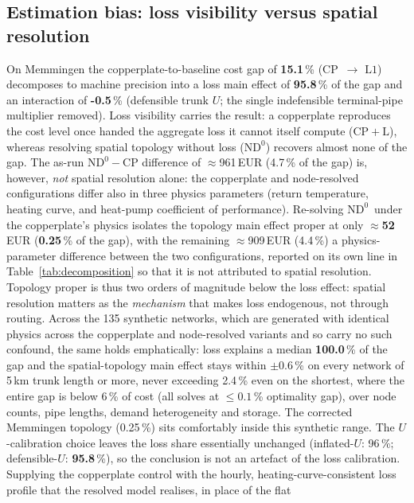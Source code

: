 \documentclass[a4paper,fleqn]{cas-sc}
\newcommand{\CP}{\ensuremath{\mathrm{CP}}}      %
\newcommand{\CPL}{\ensuremath{\mathrm{CP{+}L}}} %
\newcommand{\NDz}{\ensuremath{\mathrm{ND^{0}}}} %
\newcommand{\Lone}{\ensuremath{\mathrm{L1}}}    %
\begin{document}
\subsection{Estimation bias: loss visibility versus spatial resolution}\label{subsec:decomp}
On Memmingen the copperplate-to-baseline cost gap of \textbf{15.1}\,\%
(\CP\ $\to$ \Lone) decomposes to machine precision into a loss main effect of
\textbf{95.8}\,\% of the gap and an interaction of \textbf{-0.5}\,\% (defensible trunk $U$; the single
indefensible terminal-pipe multiplier removed). Loss visibility carries the
result: a copperplate reproduces the cost level once handed the aggregate loss it
cannot itself compute (\CPL), whereas resolving spatial topology without loss
(\NDz) recovers almost none of the gap. The as-run $\NDz-\CP$ difference of
$\approx$961\,EUR (4.7\,\% of the gap) is, however, \emph{not} spatial resolution alone: the
copperplate and node-resolved configurations differ also in three physics parameters
(return temperature, heating curve, and heat-pump coefficient of performance). Re-solving \NDz\
under the copperplate's physics isolates the topology main effect proper at only
$\approx$\textbf{52}\,EUR (\textbf{0.25}\,\% of the gap), with the remaining $\approx$909\,EUR
(4.4\,\%) a physics-parameter difference between the two configurations, reported on its own line
in Table~\ref{tab:decomposition} so that it is not attributed to spatial resolution. Topology
proper is thus two orders of magnitude below the loss effect: spatial resolution matters as the
\emph{mechanism} that makes loss endogenous, not through routing. Across the 135
synthetic networks, which are generated with identical physics across the copperplate and
node-resolved variants and so carry no such confound, the same holds emphatically: loss explains
a median \textbf{100.0}\,\% of the gap and the spatial-topology main effect stays
within $\pm$0.6\,\% on every network of 5\,km trunk length or more, never exceeding 2.4\,\% even on the shortest, where the entire gap is below 6\,\% of cost (all solves at
$\le0.1$\,\% optimality gap), over node counts, pipe lengths, demand heterogeneity and
storage. The corrected Memmingen topology (0.25\,\%) sits comfortably inside this synthetic range.
The $U$-calibration choice leaves the loss share essentially unchanged (inflated-$U$: 96\,\%;
defensible-$U$: \textbf{95.8}\,\%), so the conclusion is not an
artefact of the loss calibration. Supplying the copperplate control with the hourly,
heating-curve-consistent loss profile that the resolved model realises, in place of the flat
\end{document}
